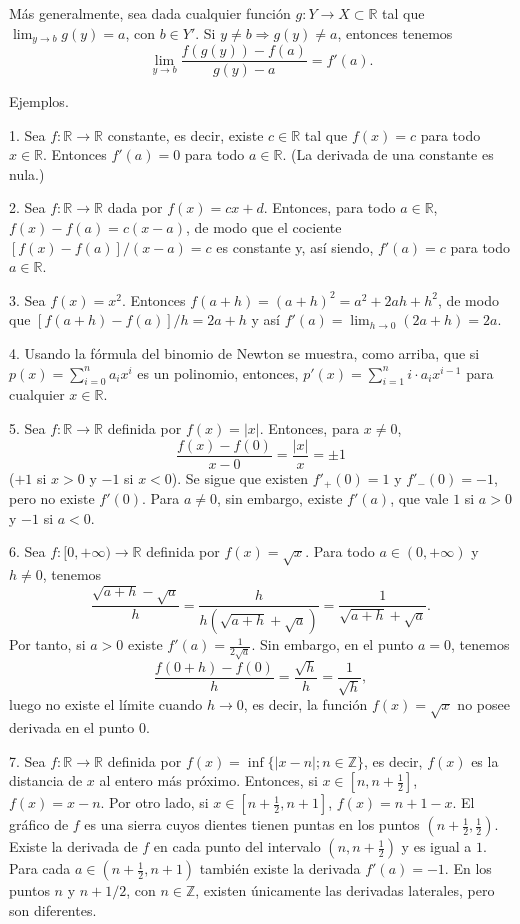 \documentclass[12pt,oneside]{book}
\begin{document}
Más generalmente, sea dada cualquier función \( g: Y \to X \subset \mathbb{R} \) tal que \( \lim_{y \to b} g(y) = a \), con \( b \in Y' \). Si \( y \neq b \Rightarrow g(y) \neq a \), entonces tenemos
\[
\lim_{y \to b} \frac{f(g(y)) - f(a)}{g(y) - a} = f'(a).
\]

Ejemplos.

1. Sea \( f: \mathbb{R} \to \mathbb{R} \) constante, es decir, existe \( c \in \mathbb{R} \) tal que \( f(x) = c \) para todo \( x \in \mathbb{R} \). Entonces \( f'(a) = 0 \) para todo \( a \in \mathbb{R} \). (La derivada de una constante es nula.)

2. Sea \( f: \mathbb{R} \to \mathbb{R} \) dada por \( f(x) = cx + d \). Entonces, para todo \( a \in \mathbb{R} \), \( f(x) - f(a) = c(x - a) \), de modo que el cociente \( [f(x) - f(a)]/(x - a) = c \) es constante y, así siendo, \( f'(a) = c \) para todo \( a \in \mathbb{R} \).

3. Sea \( f(x) = x^2 \). Entonces \( f(a + h) = (a + h)^2 = a^2 + 2ah + h^2 \), de modo que \( [f(a + h) - f(a)]/h = 2a + h \) y así \( f'(a) = \lim_{h \to 0} (2a + h) = 2a \).

4. Usando la fórmula del binomio de Newton se muestra, como arriba, que si \( p(x) = \sum_{i=0}^{n} a_i x^i \) es un polinomio, entonces, \( p'(x) = \sum_{i=1}^{n} i \cdot a_i x^{i-1} \) para cualquier \( x \in \mathbb{R} \).

5. Sea \( f: \mathbb{R} \to \mathbb{R} \) definida por \( f(x) = |x| \). Entonces, para \( x \neq 0 \),
\[
\frac{f(x) - f(0)}{x - 0} = \frac{|x|}{x} = \pm 1
\]
(\( +1 \) si \( x > 0 \) y \( -1 \) si \( x < 0 \)). Se sigue que existen \( f'_+(0) = 1 \) y \( f'_-(0) = -1 \), pero no existe \( f'(0) \). Para \( a \neq 0 \), sin embargo, existe \( f'(a) \), que vale \( 1 \) si \( a > 0 \) y \( -1 \) si \( a < 0 \).

6. Sea \( f: [0, +\infty) \to \mathbb{R} \) definida por \( f(x) = \sqrt{x} \). Para todo \( a \in (0, +\infty) \) y \( h \neq 0 \), tenemos
\[
\frac{\sqrt{a+h} - \sqrt{a}}{h} = \frac{h}{h(\sqrt{a+h} + \sqrt{a})} = \frac{1}{\sqrt{a+h} + \sqrt{a}}.
\]
Por tanto, si \( a > 0 \) existe \( f'(a) = \frac{1}{2\sqrt{a}} \). Sin embargo, en el punto \( a = 0 \), tenemos
\[
\frac{f(0+h) - f(0)}{h} = \frac{\sqrt{h}}{h} = \frac{1}{\sqrt{h}},
\]
luego no existe el límite cuando \( h \to 0 \), es decir, la función \( f(x) = \sqrt{x} \) no posee derivada en el punto \( 0 \).

7. Sea \( f: \mathbb{R} \to \mathbb{R} \) definida por \( f(x) = \inf\{|x - n|; n \in \mathbb{Z}\} \), es decir, \( f(x) \) es la distancia de \( x \) al entero más próximo. Entonces, si \( x \in [n, n + \frac{1}{2}] \), \( f(x) = x - n \). Por otro lado, si \( x \in [n + \frac{1}{2}, n + 1] \), \( f(x) = n + 1 - x \). El gráfico de \( f \) es una sierra cuyos dientes tienen puntas en los puntos \( (n + \frac{1}{2}, \frac{1}{2}) \). Existe la derivada de \( f \) en cada punto del intervalo \( (n, n + \frac{1}{2}) \) y es igual a \( 1 \). Para cada \( a \in (n + \frac{1}{2}, n + 1) \) también existe la derivada \( f'(a) = -1 \). En los puntos \( n \) y \( n + 1/2 \), con \( n \in \mathbb{Z} \), existen únicamente las derivadas laterales, pero son diferentes.
\end{document}
